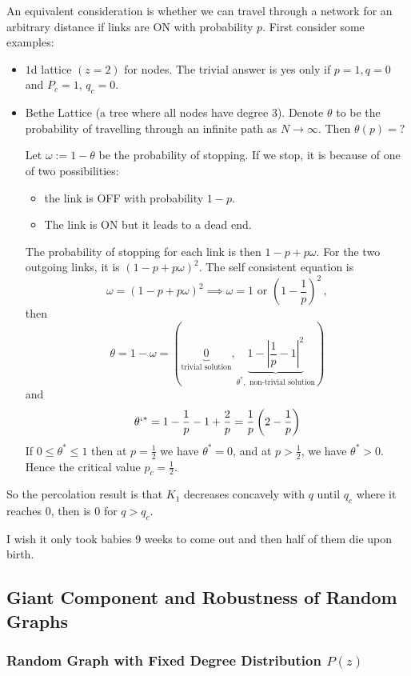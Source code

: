 \documentclass[12pt]{article}
\theoremstyle{definition}
\newcommand{\br}[1]{\left({#1}\right)}
\newcommand{\abs}[1]{\left|{#1}\right|}
\begin{document}
An equivalent consideration is whether we can travel through a network for an arbitrary distance if links are ON with probability $p$. First consider some examples: 
\begin{itemize}
    \item $1$d lattice $(z=2)$ for nodes. The trivial answer is yes only if $p=1, q=0$ and $P_c=1$, $q_c=0$. 
    \item Bethe Lattice (a tree where all nodes have degree 3). Denote $\theta$ to be the probability of travelling through an infinite path as $N\to \infty$. Then $\theta(p)=?$

    Let $\omega := 1-\theta$ be the probability of stopping. If we stop, it is because of one of two possibilities: 
    \begin{itemize}
        \item the link is OFF with probability  $1-p$. 
        \item The link is ON but it leads to a dead end. 
    \end{itemize}
    The probability of stopping for each link is then $1-p+p\omega$. For the two outgoing links, it is $(1-p+p\omega)^2$. The self consistent equation is
    \[
    \omega=(1-p+p\omega)^2\implies \omega=1 \text{ or }\left(1-\frac{1}{p}\right)^2\,,    \]
    then
    \[
    \theta = 1-\omega = \br{\underbrace{0}_{\text{trivial solution}},\underbrace{1-\abs{\frac{1}{p}-1}^2}_{\theta^*,\text{ non-trivial solution}}}
    \]
    and
    \[
    \theta`^*=1-\frac{1}{p}-1+\frac{2}{p}=\frac{1}{p}\left(2-\frac{1}{p}\right)
    \]
    If $0\leq \theta^*\leq 1$ then at $p=\frac{1}{2}$ we have $\theta^*=0$, and at $p>\frac{1}{2}$, we have $\theta^*>0$. Hence the critical value $p_c=\frac{1}{2}$. 
\end{itemize}

So the percolation result is that $K_1$ decreases concavely with $q$ until $q_c$ where it reaches 0, then is 0 for $q>q_c$. 

I wish it only took babies 9 weeks to come out
and then half of them die upon birth. 

\subsection{Giant Component and Robustness of Random Graphs}

\subsubsection*{Random Graph with Fixed Degree Distribution $P(z)$}
\end{document}
